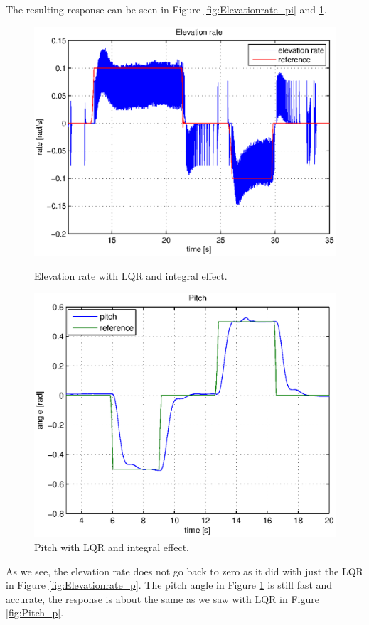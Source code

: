 The resulting response can be seen in Figure \ref{fig:Elevationrate_pi} and \ref{fig:Pitch_p_integral}.
\begin{figure}[h!]
    \begin{minipage}{.45\textwidth}
	    \includegraphics[width=1\textwidth]{plots/part3/part3_integral/elevationrate.eps}
	    \caption{Elevation rate with LQR and integral effect.}
        \label{fig:Elevationrate_pi}
    \end{minipage}\hspace{0.1\textwidth}%
    \begin{minipage}{.45\textwidth}
        \centering
		\includegraphics[width=1\textwidth]{plots/part3/part3_integral/pitch.eps}
	    \caption{Pitch with LQR and integral effect.}
        \label{fig:Pitch_p_integral}
    \end{minipage}
\end{figure}
As we see, the elevation rate does not go back to zero as it did with just the LQR in Figure \ref{fig:Elevationrate_p}. The pitch angle in Figure \ref{fig:Pitch_p_integral} is still fast and accurate, the response is about the same as we saw with LQR in Figure \ref{fig:Pitch_p}.

